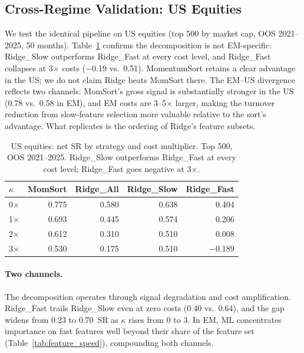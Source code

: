 \documentclass[sigconf,balance=false]{acmart}
\begin{document}
\subsection{Cross-Regime Validation: US Equities}
\label{sec:us_validation}

We test the identical pipeline on US equities (top 500 by market cap,
OOS 2021--2025, 50 months). Table~\ref{tab:us_validation} confirms
the decomposition is not EM-specific: Ridge\_Slow outperforms Ridge\_Fast
at every cost level, and Ridge\_Fast collapses at 3$\times$ costs
($-$0.19 vs.\ 0.51). MomentumSort retains a clear advantage in the
US; we do not claim Ridge beats
MomSort there. The EM--US divergence reflects two channels:
MomSort's gross signal is substantially stronger in the US (0.78 vs.\
0.58 in EM), and EM costs are 3--5$\times$ larger, making the turnover
reduction from slow-feature selection more valuable relative to the
sort's advantage. What replicates is the ordering of Ridge's feature
subsets.

\begin{table}[t]
\centering
\caption{US equities: net SR by strategy and cost multiplier. Top 500,
OOS 2021--2025. Ridge\_Slow outperforms Ridge\_Fast at every cost
level; Ridge\_Fast goes negative at 3$\times$.}
\label{tab:us_validation}
\small
\begin{tabular}{@{}lrrrr@{}}
\toprule
$\kappa$ & MomSort & Ridge\_All & Ridge\_Slow & Ridge\_Fast \\
\midrule
0$\times$ & 0.775 & 0.580 & 0.638 & 0.404 \\
1$\times$ & 0.693 & 0.445 & 0.574 & 0.206 \\
2$\times$ & 0.612 & 0.310 & 0.510 & 0.008 \\
3$\times$ & 0.530 & 0.175 & 0.510 & $-$0.189 \\
\bottomrule
\end{tabular}
\end{table}

\paragraph{Two channels.}
The decomposition operates through signal degradation and cost
amplification. Ridge\_Fast trails Ridge\_Slow even at zero costs
(0.40 vs.\ 0.64), and the gap widens from 0.23 to 0.70~SR as
$\kappa$ rises from 0 to 3. In EM, ML concentrates importance on fast
features well beyond their share of the feature set
(Table~\ref{tab:feature_speed}), compounding both channels.
\end{document}
